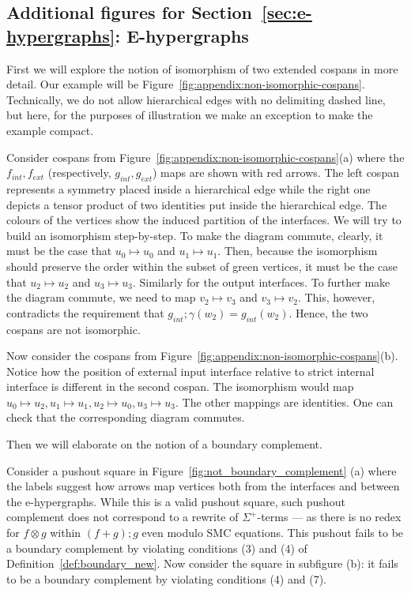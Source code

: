 \subsection{Additional figures for Section~\ref{sec:e-hypergraphs}: E-hypergraphs}
\fi
\label{sec:appendix:iso}

First we will explore the notion of isomorphism of two extended cospans in more detail.
Our example will be Figure~\ref{fig:appendix:non-isomorphic-cospans}.
Technically, we do not allow hierarchical edges with no delimiting dashed line, but here, for the purposes of illustration we make an exception to make the example compact.
\begin{example}
    Consider cospans from Figure~\ref{fig:appendix:non-isomorphic-cospans}(a) where the $f_{int}, f_{ext}$ (respectively, $g_{int},g_{ext}$) maps are shown with red arrows.
    The left cospan represents a symmetry placed inside a hierarchical edge while the right one depicts a tensor product of two identities put inside the hierarchical edge.
    The colours of the vertices show the induced partition of the interfaces.
    We will try to build an isomorphism step-by-step.
    To make the diagram commute, clearly, it must be the case that $u_0 \mapsto u_0$ and $u_1 \mapsto u_1$.
    Then, because the isomorphism should preserve the order within the subset of green vertices, it must be the case that $u_2 \mapsto u_2$ and $u_3 \mapsto u_3$.
    Similarly for the output interfaces.
    To further make the diagram commute, we need to map $v_2 \mapsto v_3$ and $v_3 \mapsto v_2$.
    This, however, contradicts the requirement that $g_{int};\gamma(w_2) = g_{int}(w_2)$.
    Hence, the two cospans are not isomorphic.
\end{example}

\begin{example}
    Now consider the cospans from Figure~\ref{fig:appendix:non-isomorphic-cospans}(b).
    Notice how the position of external input interface relative to strict internal interface is different in the second cospan.
    The isomorphism would map $u_0 \mapsto u_2, u_1 \mapsto u_1, u_2 \mapsto u_0, u_3 \mapsto u_3$.
    The other mappings are identities. 
    One can check that the corresponding diagram commutes.
\end{example}

Then we will elaborate on the notion of a boundary complement.

\begin{example}

Consider a pushout square in Figure~\ref{fig:not_boundary_complement} (a) where the labels suggest how arrows map vertices both from the interfaces and between the e-hypergraphs.
While this is a valid pushout square, such pushout complement does not correspond to a rewrite of $\Sigma^{+}$-terms --- as there is no redex for $f \otimes g$ within $(f + g);g$ even modulo SMC equations.
This pushout fails to be a boundary complement by violating conditions (3) and (4) of Definition~\ref{def:boundary_new}.
Now consider the square in subfigure (b): it fails to be a boundary complement by violating conditions (4) and (7).
\end{example}

